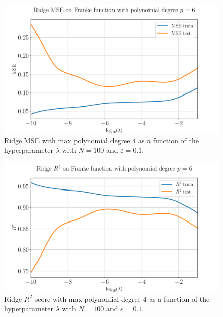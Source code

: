 \documentclass[%
reprint,
amsmath,amssymb,
aps,
pra,
]{revtex4-2}
\begin{document}
\begin{figure}[ht!]
	\centering
	\includegraphics[width=\linewidth]{Python/Figures/Ridge/RIDGE_logMSE_Unscaled.pdf}
	\caption{Ridge MSE with max polynomial degree $4$ as a function of the hyperparameter $\lambda$ with $N=100$ and $\varepsilon=0.1$.}
	\label{fig:ridge_logMSE_degree}
\end{figure}
\begin{figure}[ht!]
	\centering
	\includegraphics[width=\linewidth]{Python/Figures/Ridge/RIDGE_logR2_Unscaled.pdf}
	\caption{Ridge $R^2$-score with max polynomial degree $4$ as a function of the hyperparameter $\lambda$ with $N=100$ and $\varepsilon=0.1$.}
	\label{fig:ridge_logR2_degree}
\end{figure}
\end{document}
